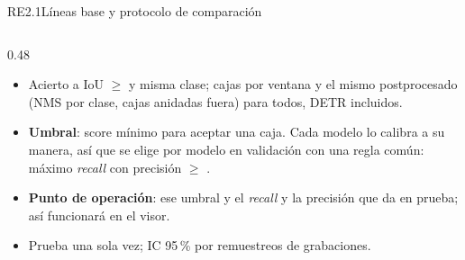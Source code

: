 \documentclass[aspectratio=169, 9pt]{beamer}
\begin{document}
\begin{frame}{RE2.1}{Líneas base y protocolo de comparación}
\begin{columns}[T]
\begin{column}{0.48\textwidth}
            \begin{itemize}
                \item Acierto a IoU $\geq$ \matchIou{} y misma clase; \maxDetections{} cajas
                      por ventana y el mismo postprocesado (NMS \nmsIou{} por clase, cajas
                      anidadas fuera) para todos, DETR incluidos.
                \item \textbf{Umbral}: score mínimo para aceptar una caja. Cada modelo lo
                      calibra a su manera, así que se elige por modelo en validación con una
                      regla común: máximo \textit{recall} con precisión $\geq$ \minPrecision{}.
                \item \textbf{Punto de operación}: ese umbral y el \textit{recall} y la
                      precisión que da en prueba; así funcionará en el visor.
                \item Prueba una sola vez; IC 95\,\% por \nBootstrap{} remuestreos de
                      grabaciones.
            \end{itemize}
        \end{column}
    \end{columns}
\end{frame}
\end{document}
